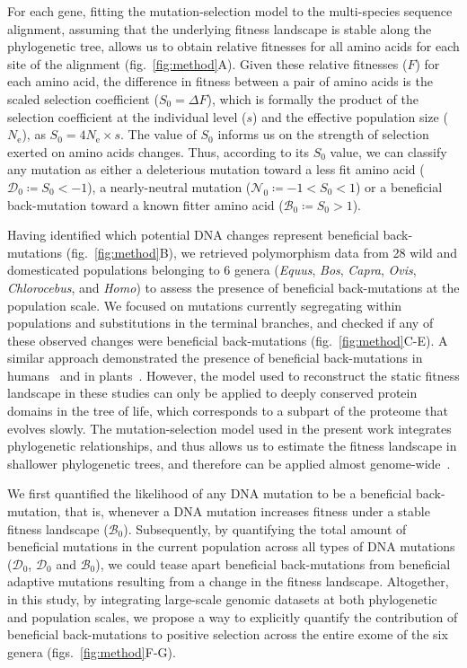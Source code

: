 \documentclass[9pt,twocolumn,twoside,lineno]{pnas-new}
\newcommand{\Ne}{N_{\text{e}}}
\newcommand{\Sphy}{S_{0}}
\newcommand{\SphyDel}{\mathcal{D}_0}
\newcommand{\SphyNeu}{\mathcal{N}_0}
\newcommand{\SphyBen}{\mathcal{B}_0}
\begin{document}
For each gene, fitting the mutation-selection model to the multi-species sequence alignment, assuming that the underlying fitness landscape is stable along the phylogenetic tree, allows us to obtain relative fitnesses for all amino acids for each site of the alignment (fig.~\ref{fig:method}A).
Given these relative fitnesses ($F$) for each amino acid, the difference in fitness between a pair of amino acids is the scaled selection coefficient ($\Sphy = \Delta F$), which is formally the product of the selection coefficient at the individual level ($s$) and the effective population size ($\Ne$), as $\Sphy = 4 \Ne \times s$. The value of $\Sphy$ informs us on the strength of selection exerted on amino acids changes.
Thus, according to its $\Sphy$ value, we can classify any mutation as either a deleterious mutation toward a less fit amino acid ($\SphyDel \coloneqq \Sphy < -1$), a nearly-neutral mutation ($\SphyNeu \coloneqq -1 < \Sphy <1$) or a beneficial back-mutation toward a known fitter amino acid ($\SphyBen \coloneqq \Sphy > 1$).

Having identified which potential DNA changes represent beneficial back-mutations (fig.~\ref{fig:method}B), we retrieved polymorphism data from 28 wild and domesticated populations belonging to 6 genera (\textit{Equus}, \textit{Bos}, \textit{Capra}, \textit{Ovis}, \textit{Chlorocebus}, and \textit{Homo}) to assess the presence of beneficial back-mutations at the population scale.
We focused on mutations currently segregating within populations and substitutions in the terminal branches, and checked if any of these observed changes were beneficial back-mutations (fig.~\ref{fig:method}C-E).
A similar approach demonstrated the presence of beneficial back-mutations in humans~\cite{moses_inferring_2009, fischer_germline_2011} and in plants~\cite{chen_hunting_2021}.
However, the model used to reconstruct the static fitness landscape in these studies can only be applied to deeply conserved protein domains in the tree of life, which corresponds to a subpart of the proteome that evolves slowly.
The mutation-selection model used in the present work integrates phylogenetic relationships, and thus allows us to estimate the fitness landscape in shallower phylogenetic trees, and therefore can be applied almost genome-wide~\cite{rodrigue_mutationselection_2010}.

We first quantified the likelihood of any DNA mutation to be a beneficial back-mutation, that is, whenever a DNA mutation increases fitness under a stable fitness landscape ($\SphyBen$).
Subsequently, by quantifying the total amount of beneficial mutations in the current population across all types of DNA mutations ($\SphyDel$, $\SphyDel$ and $\SphyBen$), we could tease apart beneficial back-mutations from beneficial adaptive mutations resulting from a change in the fitness landscape.
Altogether, in this study, by integrating large-scale genomic datasets at both phylogenetic and population scales, we propose a way to explicitly quantify the contribution of beneficial back-mutations to positive selection across the entire exome of the six genera (figs.~\ref{fig:method}F-G).
\end{document}
